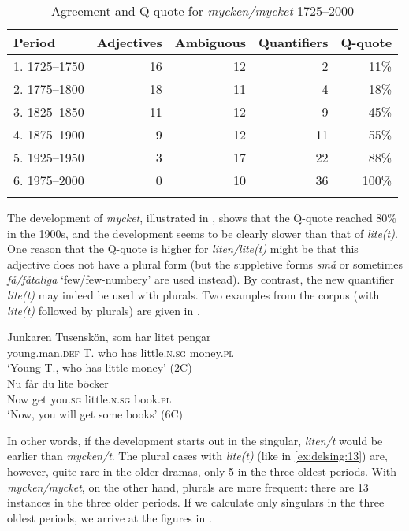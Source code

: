 \documentclass[output=paper]{langscibook}
\begin{document}
\begin{table}
\caption{Agreement and Q-quote for \textit{mycken/mycket} 1725–2000}
\label{tab:delsing:4}
\begin{tabular}{lrrrr}
\lsptoprule
Period & Adjectives & Ambiguous & Quantifiers & Q-quote\\
\midrule
1. 1725–1750 & 16 & 12 & 2 & 11\%\\
2. 1775–1800 & 18 & 11 & 4 & 18\%\\
3. 1825–1850 & 11 & 12 & 9 & 45\%\\
4. 1875–1900 & 9 & 12 & 11 & 55\%\\
5. 1925–1950 & 3 & 17 & 22 & 88\%\\
6. 1975–2000 & 0 & 10 & 36 & 100\%\\
\lspbottomrule
\end{tabular}
\end{table}

The development of \textit{mycket}, illustrated in , shows that the Q-quote reached 80\% in the 1900s, and the development seems to be clearly slower than that of \textit{lite(t)}. One reason that the Q-quote is higher for \textit{liten/lite(t)} might be that this adjective does not have a plural form (but the suppletive forms \textit{små} or sometimes \textit{få/fåtaliga} ‘few/few-numbery’ are used instead). By contrast, the new quantifier \textit{lite(t)} may indeed be used with plurals. Two examples from the corpus (with \textit{lite(t)} followed by plurals) are given in .


\ea\label{ex:delsing:13}
\ea \gll Junkaren      Tusenskön,     som   har   litet         pengar\\   
          young.man\textsc{.def}  T.  who     has   little.\textsc{n.sg}  money.\textsc{pl}\\
 \glt ‘Young T., who has little money’ (2C)\\
\ex \gll Nu      får     du            lite         böcker\\
  Now  get     you\textsc{.sg}     little.\textsc{n.sg}   book.\textsc{pl}\\
  \glt ‘Now, you will get some books’ (6C)\\
\z
\z


In other words, if the development starts out in the singular, \textit{liten/t} would be earlier than \textit{mycken/t}. The plural cases with \textit{lite(t)} (like in \ref{ex:delsing:13}) are, however, quite rare in the older dramas, only 5 in the three oldest periods. With \textit{mycken/mycket}, on the other hand, plurals are more frequent: there are 13 instances in the three older periods. If we calculate only singulars in the three oldest periods, we arrive at the figures in .
\end{document}
